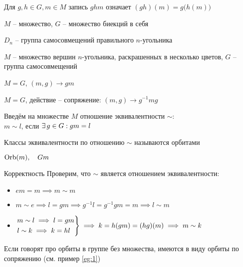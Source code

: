 \begin{remark}
	Для $ g, h \in G, m \in M $ запись $ ghm $ означает $ (gh)(m) = g \big( h(m) \big) $
\end{remark}

\begin{exmpls}
	\item $ M $ -- множество, $ G $ -- множество биекций в себя
    \item $ D_n $ -- группа самосовмещений правильного $ n $-угольника
    \item $ M $ -- множество вершин $ n $-угольника, раскрашенных в несколько цветов, $ G $ -- группа самосовмещений
    \item $ M = G $, $ (m, g) \to gm $
    \item \label{eg:1} $ M = G $, действие -- сопряжение: $ (m, g) \to g^{-1}mg $
\end{exmpls}

\begin{definition}
	Введём на множестве $ M $ отношение эквивалентности $ \sim $: \\
    $ m \sim l $, если $ \exists\, g \in G : gm = l $
\end{definition}

\begin{definition}
	Классы эквивалентности по отношению $ \sim $ называются орбитами
\end{definition}

\begin{notation}
	$ \operatorname{Orb}(m), \quad Gm $
\end{notation}

\begin{undefthm}{Корректность}
	Проверим, что $ \sim $ является отношением эквивалентности:
    \begin{itemize}
    	\item $ em = m \implies m \sim m $
        \item $ m \sim e \implies l = gm \implies g^{-1}l = g^{-1}gm = m \implies l \sim m $
        \item $
        \begin{rcases}
        	m \sim l \implies l = gm \\
            l \sim k \implies k = hl
        \end{rcases} \implies k = h(gm) = (hg)(m) \implies m \sim k $
    \end{itemize}
\end{undefthm}

\begin{remark}
    Если говорят про орбиты в группе без множества, имеются в виду орбиты по сопряжению (см. пример \ref{eg:1})
\end{remark}

